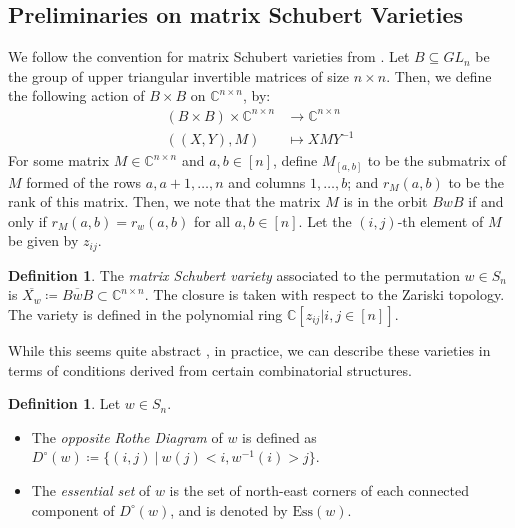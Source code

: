 \documentclass[11pt]{amsart}
\theoremstyle{definition}
\theoremstyle{definition}
\newtheorem{definition}[theorem]{Definition}
\theoremstyle{definition}
\theoremstyle{definition}
\newcommand{\Ess}{\mathrm{Ess}}
\begin{document}
\subsection{Preliminaries on matrix Schubert Varieties}\label{subsec: prelim mSV} 
We follow the convention for matrix Schubert varieties from \cite{donten2021complexity}. Let $B \subseteq GL_n$ be the group of upper triangular invertible matrices of size $n\times n$. Then, we define the following action of $B\times B$ on $\mathbb{C}^{n\times n}$, by:
\begin{align*}
    (B \times B) \times \mathbb{C}^{n\times n} &\rightarrow \mathbb{C}^{n\times n}\\
    ((X,Y),M) &\mapsto XMY^{-1}
\end{align*}
For some matrix $M \in \mathbb{C}^{n\times n}$ and $a, b \in [n]$, define $M_{[a,b]}$ to be the submatrix of $M$ formed of the rows $a, a+1, \ldots, n$ and columns $1, \ldots, b$; and $r_M(a,b)$ to be the rank of this matrix. Then, we note that the matrix $M$ is in the orbit $BwB$ if and only if $r_M(a,b) = r_w(a,b)$ for all $a, b \in [n]$. Let the $(i,j)$-th element of $M$ be given by $z_{ij}$. 


\begin{definition}
    The \textit{matrix Schubert variety} associated to the permutation $w \in S_n$ is $\overline{X_w} \coloneqq \overline{BwB} \subset \mathbb C^{n \times n}$. The closure is taken with respect to the Zariski topology. The variety is defined in the polynomial ring $\mathbb{C}[z_{ij}|i,j\in[n]]$. 
\end{definition}

\noindent While this seems quite abstract , in practice, we can describe these varieties in terms of conditions derived from certain combinatorial structures.

\begin{definition}
    Let $w \in S_n.$
    \begin{itemize}
        \item The \textit{opposite Rothe Diagram} of $w$ is defined as $D^{\circ}(w) \coloneqq \{(i, j) \ | \  w(j)<i, w^{-1}(i)>j\}$.
        \item The \textit{essential set} of $w$ is the set of north-east corners of each connected component of $D^{\circ}(w)$, and is denoted by $\Ess(w)$. 
    \end{itemize}
\end{definition}
\end{document}
